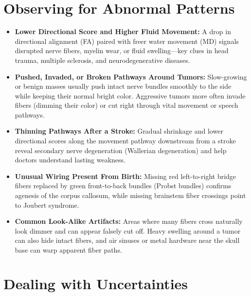 \section{Observing for Abnormal Patterns}

\begin{itemize}
    \item \textbf{Lower Directional Score and Higher Fluid Movement:} A drop in directional alignment (FA) paired with freer water movement (MD) signals disrupted nerve fibers, myelin wear, or fluid swelling---key clues in head trauma, multiple sclerosis, and neurodegenerative diseases.
    \item \textbf{Pushed, Invaded, or Broken Pathways Around Tumors:} Slow-growing or benign masses usually push intact nerve bundles smoothly to the side while keeping their normal bright color. Aggressive tumors more often invade fibers (dimming their color) or cut right through vital movement or speech pathways.
    \item \textbf{Thinning Pathways After a Stroke:} Gradual shrinkage and lower directional scores along the movement pathway downstream from a stroke reveal secondary nerve degeneration (Wallerian degeneration) and help doctors understand lasting weakness.
    \item \textbf{Unusual Wiring Present From Birth:} Missing red left-to-right bridge fibers replaced by green front-to-back bundles (Probst bundles) confirms agenesis of the corpus callosum, while missing brainstem fiber crossings point to Joubert syndrome.
    \item \textbf{Common Look-Alike Artifacts:} Areas where many fibers cross naturally look dimmer and can appear falsely cut off. Heavy swelling around a tumor can also hide intact fibers, and air sinuses or metal hardware near the skull base can warp apparent fiber paths.
\end{itemize}

\section{Dealing with Uncertainties}

